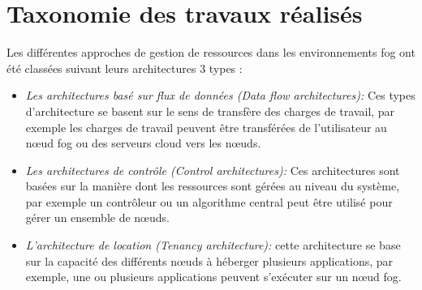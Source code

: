  \section{Taxonomie des travaux réalisés}
 Les différentes approches de gestion de ressources dans les environnements fog ont été classées suivant leurs architectures 3 types\cite{ch2019} :
 \begin{itemize}
   \item \emph{Les architectures basé sur flux de données (Data flow architectures):} Ces types d’architecture se basent sur le sens de transfère des charges de travail, par exemple les charges de travail peuvent être transférées de l’utilisateur au nœud fog ou des serveurs cloud vers les nœuds.
   \item \emph{Les architectures de contrôle (Control architectures):} Ces architectures sont basées sur la manière dont les ressources sont gérées au niveau du système, par exemple un contrôleur ou un algorithme central peut être utilisé pour gérer un ensemble de nœuds.
   \item \emph{L’architecture de location (Tenancy architecture):} cette architecture se base sur la capacité des différents nœuds à héberger plusieurs applications,  par exemple, une ou plusieurs applications peuvent s'exécuter sur un nœud fog.
 \end{itemize}

 
 
 
   
  



 
